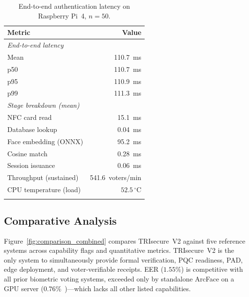 \documentclass[pdflatex,sn-mathphys-num]{sn-jnl}%
\theoremstyle{thmstyleone}%
\theoremstyle{thmstyletwo}%
\theoremstyle{thmstylethree}%
\begin{document}
\begin{table}[t]
\caption{End-to-end authentication latency on Raspberry Pi~4, \(n{=}50\).}
\label{tab:pi}%
\begin{tabular}{@{}lr@{}}
  \toprule
  Metric & Value \\
  \midrule
  \multicolumn{2}{l}{\textit{End-to-end latency}} \\
  \quad Mean & 110.7~ms \\
  \quad p50  & 110.7~ms \\
  \quad p95  & 110.9~ms \\
  \quad p99  & 111.3~ms \\
  \midrule
  \multicolumn{2}{l}{\textit{Stage breakdown (mean)}} \\
  \quad NFC card read         & 15.1~ms \\
  \quad Database lookup       & 0.04~ms \\
  \quad Face embedding (ONNX) & 95.2~ms \\
  \quad Cosine match          & 0.28~ms \\
  \quad Session issuance      & 0.06~ms \\
  \midrule
  Throughput (sustained) & 541.6~voters/min \\
  CPU temperature (load) & \(52.5\,^\circ\)C \\
  \botrule
\end{tabular}
\end{table}

\subsection{Comparative Analysis}\label{sec:comparison}

Figure~\ref{fig:comparison_combined} compares TRIsecure~V2 against five
reference systems across capability flags and quantitative metrics.
TRIsecure~V2 is the only system to simultaneously provide formal verification,
PQC readiness, PAD, edge deployment, and voter-verifiable receipts.
EER (\(1.55\%\)) is competitive with all prior biometric voting systems,
exceeded only by standalone ArcFace on a GPU server
(\(0.76\%\)~\cite{deng2019arcface})---which lacks all other listed capabilities.
\end{document}

